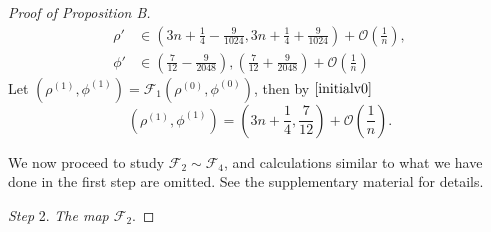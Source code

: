 \documentclass{article}
\numberwithin{figure}{section}
\numberwithin{equation}{section}
\theoremstyle{remark}
\theoremstyle{definition}
\begin{document}
\begin{proof}[Proof of Proposition B]
       \begin{equation}\label{region1rhopsi}
       \begin{split}
           \rho'&\in\left(3n+\frac{1}{4}-\frac{9}{1024},3n+\frac{1}{4}+\frac{9}{1024}\right)+\mathcal{O}\left(\frac{1}{n}\right),\\
           \phi'&\in\left(\frac{7}{12}-\frac{9}{2048}\right),\left(\frac{7}{12}+\frac{9}{2048}\right)+\mathcal{O}\left(\frac{1}{n}\right)
        \end{split}
       \end{equation}
       Let $(\rho^{(1)},\phi^{(1)})=\mathcal{F}_1(\rho^{(0)},\phi^{(0)})$, then by $\ref{initialv0}$
       \begin{equation}\label{fixpoint 1}
           (\rho^{(1)},\phi^{(1)})=\left(3n+\frac{1}{4},\frac{7}{12}\right)+\mathcal{O}\left(\frac{1}{n}\right).
       \end{equation}

{\color{red} We now proceed to study $\mathcal{F}_2\sim\mathcal{F}_4$, and calculations similar to what we have done in the first step are omitted. See the supplementary material for details.}

\emph{Step} 2. \emph{The map $\mathcal{F}_2$}.


\end{proof}
\end{document}
